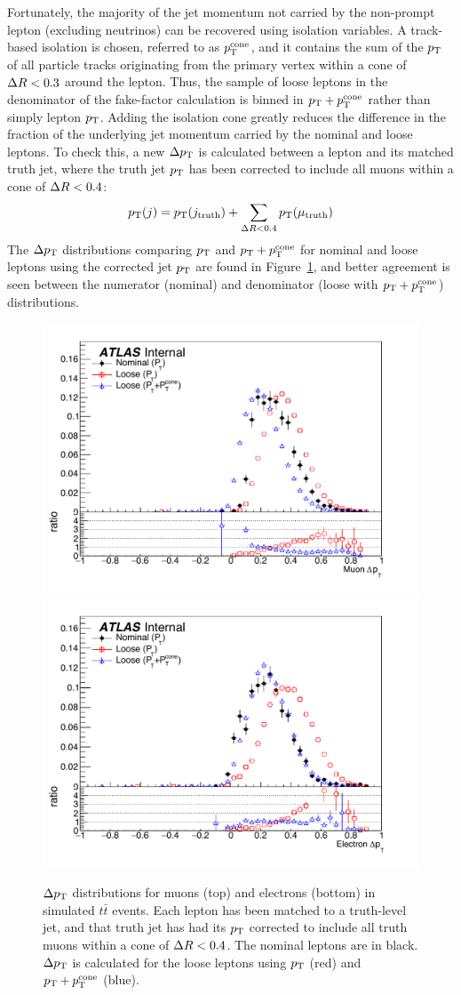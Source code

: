 Fortunately, the majority of the jet momentum not carried by the non-prompt lepton (excluding neutrinos) can be recovered using isolation variables.
A track-based isolation is chosen, referred to as $p_{\mathrm{T}}^{\textrm{cone}}$, and it contains the sum of the $p_{\mathrm{T}}$ of all particle tracks originating from the primary vertex within a cone of $\Delta R < 0.3$ around the lepton.
Thus, the sample of loose leptons in the denominator of the fake-factor calculation is binned in $p_{\mathrm{T}}+p_{\mathrm{T}}^{\textrm{cone}}$ rather than simply lepton $p_{\mathrm{T}}$.
Adding the isolation cone greatly reduces the difference in the fraction of the underlying jet momentum carried by the nominal and loose leptons.
To check this, a new $\Delta p_{\mathrm{T}}$ is calculated between a lepton and its matched truth jet, where the truth jet $p_{\mathrm{T}}$ has been corrected to include all muons within a cone of $\Delta R < 0.4$:
\begin{equation}
\pt(j) = \pt(j_{\textrm{truth}})+\sum\limits_{\deltar < 0.4}\pt(\mu_{\textrm{truth}})
\label{eq:ssww13tev_ff_jet_corr}
\end{equation}
The $\Delta p_{\mathrm{T}}$ distributions comparing $p_{\mathrm{T}}$ and $p_{\mathrm{T}}+p_{\mathrm{T}}^{\textrm{cone}}$ for nominal and loose leptons using the corrected jet $p_{\mathrm{T}}$ are found in Figure~\ref{fig:ssww13tev_ff_deltapt_ptcone}, and better agreement is seen between the numerator (nominal) and denominator (loose with $p_{\mathrm{T}}+p_{\mathrm{T}}^{\textrm{cone}}$) distributions.

\begin{figure}[htbp]
  \centering
  \includegraphics[width=.6\textwidth]{figs/ssww_13tev/backgrounds/ff/dpt_muon_ttbar}\\
  \includegraphics[width=.6\textwidth]{figs/ssww_13tev/backgrounds/ff/dpt_elec_ttbar}
  \caption{$\Delta p_{\mathrm{T}}$ distributions for muons (top) and electrons (bottom) in simulated $t\bar{t}$ events.  Each lepton has been matched to a truth-level jet, and that truth jet has had its $p_{\mathrm{T}}$ corrected to include all truth muons within a cone of $\Delta R < 0.4$.  The nominal leptons are in black. $\Delta p_{\mathrm{T}}$ is calculated for the loose leptons using $p_{\mathrm{T}}$ (red) and $p_{\mathrm{T}}+p_{\mathrm{T}}^{\textrm{cone}}$ (blue).}
  \label{fig:ssww13tev_ff_deltapt_ptcone}
\end{figure}

